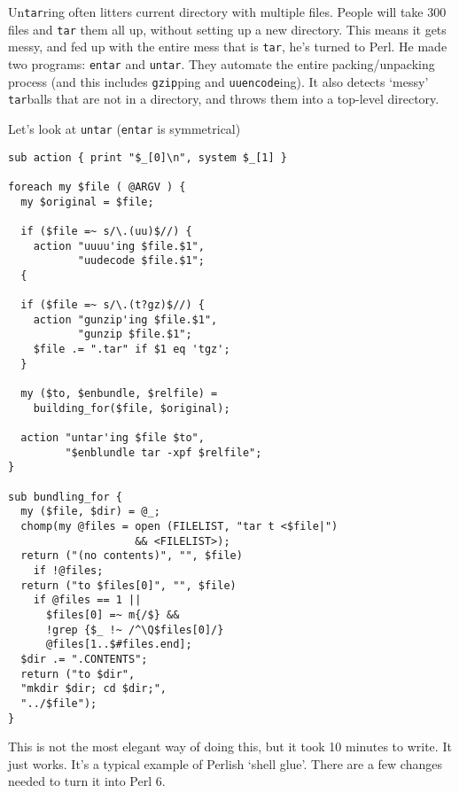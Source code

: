 \documentclass{article}
\newenvironment{example}
  {\addtolength{\linewidth}{-\parindent}%
   \null\begin{minipage}{\linewidth}}
  {\end{minipage}\addtolength{\linewidth}{\parindent}\null}
\begin{document}
Un\verb'tar'ring often litters current directory with multiple files.
People will take 300 files and \verb'tar' them all up, without setting
up a new directory.  This means it gets messy, and fed up with the
entire mess that is \verb'tar', he's turned to Perl.  He made two
programs: \verb'entar' and \verb'untar'.  They automate the entire
packing/unpacking process (and this includes \verb'gzip'ping and
\verb'uuencode'ing).  It also detects `messy' \verb'tar'balls that are
not in a directory,  and throws them into a top-level directory.

\begin{example}
Let's look at \verb'untar' (\verb'entar' is symmetrical)
\begin{verbatim}
sub action { print "$_[0]\n", system $_[1] }

foreach my $file ( @ARGV ) {
  my $original = $file;

  if ($file =~ s/\.(uu)$//) {
    action "uuuu'ing $file.$1",
           "uudecode $file.$1";
  {

  if ($file =~ s/\.(t?gz)$//) {
    action "gunzip'ing $file.$1",
           "gunzip $file.$1";
    $file .= ".tar" if $1 eq 'tgz';
  }

  my ($to, $enbundle, $relfile) = 
    building_for($file, $original);

  action "untar'ing $file $to",
         "$enblundle tar -xpf $relfile";
}

sub bundling_for {
  my ($file, $dir) = @_;
  chomp(my @files = open (FILELIST, "tar t <$file|")
                    && <FILELIST>);
  return ("(no contents)", "", $file)
    if !@files;
  return ("to $files[0]", "", $file)
    if @files == 1 ||
      $files[0] =~ m{/$} &&
	  !grep {$_ !~ /^\Q$files[0]/}
	  @files[1..$#files.end];
  $dir .= ".CONTENTS";
  return ("to $dir",
  "mkdir $dir; cd $dir;",
  "../$file");
}

\end{verbatim}
\end{example}

This is not the most elegant way of doing this, but it took 10 minutes
to write.  It just works.  It's a typical example of Perlish `shell
glue'.  There are a few changes needed to turn it into Perl 6.
\end{document}
